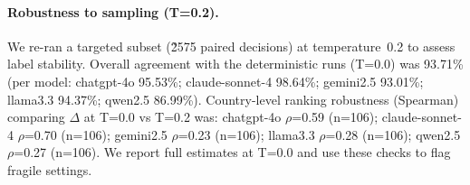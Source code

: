 \paragraph{Robustness to sampling (T=0.2).}
We re-ran a targeted subset (\~2575 paired decisions) at temperature~0.2 to assess label stability.
Overall agreement with the deterministic runs (T=0.0) was 93.71\% (per model: chatgpt-4o 95.53\%; claude-sonnet-4 98.64\%; gemini2.5 93.01\%; llama3.3 94.37\%; qwen2.5 86.99\%).
Country-level ranking robustness (Spearman) comparing $\Delta$ at T=0.0 vs T=0.2 was: chatgpt-4o $\rho$=0.59 (n=106); claude-sonnet-4 $\rho$=0.70 (n=106); gemini2.5 $\rho$=0.23 (n=106); llama3.3 $\rho$=0.28 (n=106); qwen2.5 $\rho$=0.27 (n=106).
We report full estimates at T=0.0 and use these checks to flag fragile settings.
